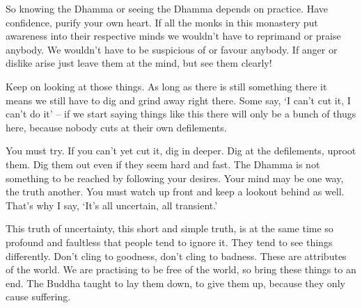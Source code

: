 So knowing the Dhamma or seeing the Dhamma depends on practice. Have confidence, purify your own heart. If all the monks in this monastery put awareness into their respective minds we wouldn't have to reprimand or praise anybody. We wouldn't have to be suspicious of or favour anybody. If anger or dislike arise just leave them at the mind, but see them clearly!

Keep on looking at those things. As long as there is still something there it means we still have to dig and grind away right there. Some say, `I can't cut it, I can't do it' -- if we start saying things like this there will only be a bunch of thugs here, because nobody cuts at their own defilements.

You must try. If you can't yet cut it, dig in deeper. Dig at the defilements, uproot them. Dig them out even if they seem hard and fast. The Dhamma is not something to be reached by following your desires. Your mind may be one way, the truth another. You must watch up front and keep a lookout behind as well. That's why I say, `It's all uncertain, all transient.'

This truth of uncertainty, this short and simple truth, is at the same time so profound and faultless that people tend to ignore it. They tend to see things differently. Don't cling to goodness, don't cling to badness. These are attributes of the world. We are practising to be free of the world, so bring these things to an end. The Buddha taught to lay them down, to give them up, because they only cause suffering.

